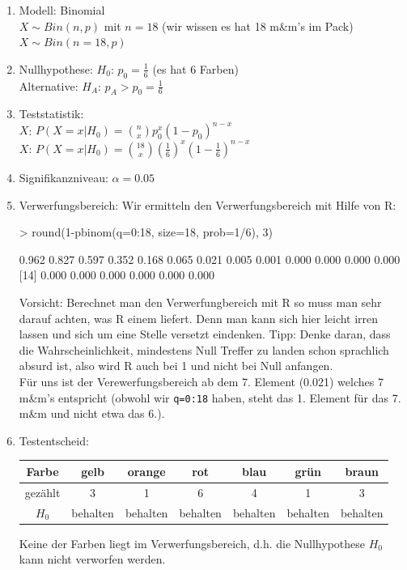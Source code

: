 \begin{enumerate}
	\item Modell: Binomial\\
	$X \sim Bin(n,p)$ mit $n=18$ (wir wissen es hat 18 m\&m's im Pack)\\
	$X \sim Bin(n=18, p)$
	\item Nullhypothese: $H_0$: $p_0 = \frac{1}{6}$ (es hat 6 Farben) \\
	Alternative: $H_A$: $p_A > p_0 = \frac{1}{6}$ 
	\item Teststatistik: \\
	$X$: $P(X=x|H_0)={n \choose x} p_0^x (1-p_0)^{n-x}$ \\
	$X$: $P(X=x|H_0)={18 \choose x} (\frac{1}{6})^x (1-\frac{1}{6})^{n-x}$
	\item Signifikanzniveau: $\alpha=0.05$
	\item Verwerfungsbereich:
	Wir ermitteln den Verwerfungsbereich mit Hilfe von R:
\begin{Schunk}
\begin{Sinput}
> round(1-pbinom(q=0:18, size=18, prob=1/6), 3)
\end{Sinput}
\begin{Soutput}
 [1] 0.962 0.827 0.597 0.352 0.168 0.065 0.021 0.005 0.001 0.000 0.000 0.000 0.000
[14] 0.000 0.000 0.000 0.000 0.000 0.000
\end{Soutput}
\end{Schunk}
	Vorsicht: Berechnet man den Verwerfungbereich mit R so muss man sehr
	darauf achten, was R einem liefert. Denn man kann sich hier leicht 
	irren lassen und sich um eine Stelle versetzt eindenken. Tipp: Denke
	daran, dass die Wahrscheinlichkeit, mindestens Null Treffer zu landen
	schon sprachlich absurd ist, also wird R auch bei 1 und nicht bei Null
	anfangen.\\
	Für uns ist der Verewerfungsbereich ab dem 7. Element (0.021) welches
	7 m\&m's entspricht (obwohl wir \verb!q=0:18! haben, steht das 1. Element
	für das 7. m\&m und nicht etwa das 6.).
	\item Testentscheid:\\
	
	\begin{table}[h!]
	\centering
	\begin{tabular}{c|c|c|c|c|c|c}
	Farbe & gelb & orange & rot & blau & grün & braun \\
	\hline
	gezählt & 3 & 1 & 6 & 4 & 1 & 3 \\
	\hline
	$H_0$ & behalten & behalten & behalten & behalten & behalten & behalten \\ 
	\end{tabular}
	\end{table}

	\noindent
	Keine der Farben liegt im Verwerfungsbereich, d.h. die Nullhypothese
	$H_0$ kann nicht verworfen werden.
\end{enumerate}


